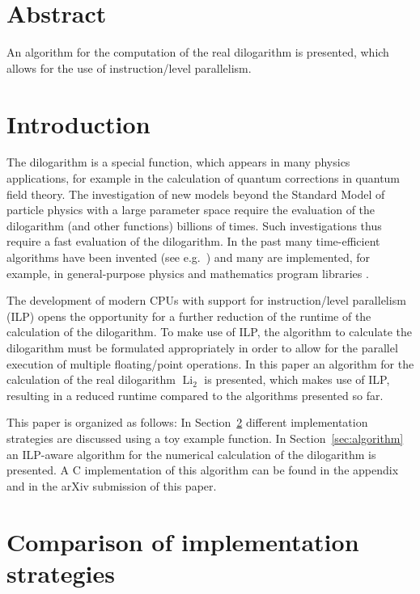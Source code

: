 \documentclass[10pt,DIV16,twocolumn,numbers=noenddot]{scrartcl}
\title{\mytitle}
\author{\myauthor}
\affil{Fachbereich Energie und Biotechnologie, Hochschule Flensburg,\\ Kanzleistra{\ss}e 91--93, 24943 Flensburg, Germany}
\date{\today}
\newcommand{\Li}{\operatorname{Li}_2}
\newcommand{\secref}[1]{Section~\ref{#1}}
\begin{document}
\maketitle

\section*{Abstract}

An algorithm for the computation of the real dilogarithm is presented,
which allows for the use of instruction\-/level parallelism.

\section{Introduction}

The dilogarithm \cite{lewin} is a special function, which appears in
many physics applications, for example in the calculation of quantum
corrections in quantum field theory.  The investigation of new models
beyond the Standard Model of particle physics with a large parameter
space require the evaluation of the dilogarithm (and other functions)
billions of times.  Such investigations thus require a fast evaluation
of the dilogarithm.  In the past many time-efficient algorithms have
been invented (see e.g.~\cite{koelbigDilog,ginsberg,morris}) and many
are implemented, for example, in general-purpose physics and
mathematics program libraries \cite{root,gsl,cephes}.

The development of modern CPUs with support for instruction\-/level
parallelism (ILP) opens the opportunity for a further reduction of the
runtime of the calculation of the dilogarithm.  To make use of ILP,
the algorithm to calculate the dilogarithm must be formulated
appropriately in order to allow for the parallel execution of multiple
floating\-/point operations.  In this paper an algorithm for the
calculation of the real dilogarithm $\Li$ is presented, which makes
use of ILP, resulting in a reduced runtime compared to the algorithms
presented so far.

This paper is organized as follows: In \secref{sec:toymodel} different
implementation strategies are discussed using a toy example function.
In \secref{sec:algorithm} an ILP-aware algorithm for the numerical
calculation of the dilogarithm is presented.  A C implementation of
this algorithm can be found in the appendix and in the arXiv
submission of this paper.

\section{Comparison of implementation strategies}
\label{sec:toymodel}
\end{document}
